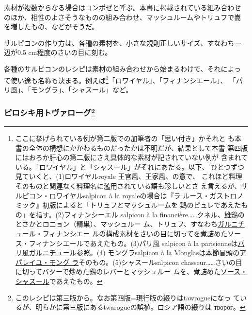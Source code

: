 \begin{recette}
素材が複数からなる場合はコンポゼと呼ぶ。本書に掲載されている組み合わせ
のほか、相性のよさそうなものの組み合わせ、マッシュルームやトリュフで嵩
を増したもの、などがそうだ。

サルピコンの作り方は、各種の素材を、小さな規則正しいサイズ、すなわち一
辺が0.5 cm程度のさいの目に刻む。

各種のサルピコンのレシピは素材の組み合わせから始まるわけで、それによっ
て使い途も名称も決まる。例えば\footnote{ここに挙げられている例が第二版での加筆者の「思い付き」かそれと
  も本書の全体の構想にかかわるものだったかは不明だが、結果として本書
  第四版にはおろか肝心の第二版にさえ具体的な素材が記されていない例が
  含まれている。「ロワイヤル」と「シャスール」がそれにあたる。以下、
  ひとつずつ見ていくと、(1)ロワイヤルroyale 王宮風、王家風、の意で、
  これほど料理そのものと関連なく料理名に濫用されている語も珍しいとさ
  え言えるが、サルピコン・ロワイヤルsalpicon à la royaleの場合は『ラ
  ルース・ガストロノミック』初版によると「トリュフとマッシュルームを
  鶏のピュレであえたもの」を指す。(2)フィナンシーエル salpicon à la
  financière\ldots{}\ldots{}クネル、雄鶏のとさかとロニョン（精巣）、マッシュルー
  ム、トリュフ、すなわち\protect\hyperlink{garniture-financiere}{ガルニチュール・フィナンシエー
  ル}の構成素材をさいの目に切ってを煮詰めたソー
  ス・フィナンシエールであえたもの。(3)パリ風 salpicon à la
  parisienneは\protect\hyperlink{garniture-parisienne}{パリ風ガルニチュール}参照。(4)
  モングラsalpicon à la
  Monglasは本節冒頭の\protect\hyperlink{appareil-montglas}{アパレイユ・モング
  ラ}そのもの。(5)シャスールsalpicon
  chasseur\ldots{}\ldots{}さいの目に切ってバターで炒めた鶏のレバーとマッシュルー
  ムを、煮詰めた\protect\hyperlink{sauce-chasseur}{ソース・シャスール}であえたもの。}「ロワイヤル」、「フィナンシエール」、
「パリ風」、「モングラ」、「シャスール」など。

\hypertarget{ux30d4ux30edux30b7ux30adux7528ux30c8ux30f4ux30a1ux30edux30fcux30b072}{%
\subsubsection[ピロシキ用トヴァローグ]{\texorpdfstring{ピロシキ用トヴァローグ\footnote{このレシピは第三版から。なお第四版=現行版の綴りはtawrogueになっ
  ているが、明らかに第三版にあるtwarogueの誤植。ロシア語の綴りは
  творог。}}{ピロシキ用トヴァローグ}}\label{ux30d4ux30edux30b7ux30adux7528ux30c8ux30f4ux30a1ux30edux30fcux30b072}}



\end{recette}
